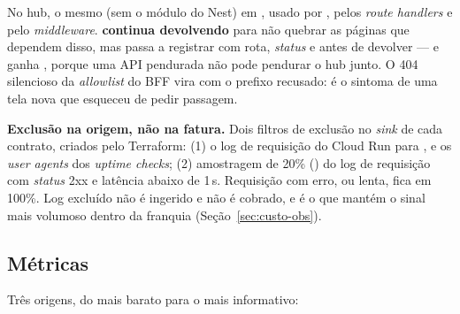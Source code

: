 No hub, o mesmo  (sem o módulo do Nest) em , usado
por , pelos \emph{route handlers} e pelo
\emph{middleware}.  \textbf{continua devolvendo }
para não quebrar as páginas que dependem disso, mas passa a registrar
 com rota, \emph{status} e  antes de devolver ---
e ganha , porque uma API pendurada não pode
pendurar o hub junto. O 404 silencioso da \emph{allowlist} do BFF vira
 com o prefixo recusado: é o sintoma de uma tela nova que
esqueceu de pedir passagem.

\begin{regra}
\textbf{Exclusão na origem, não na fatura.} Dois filtros de exclusão no
\emph{sink}  de cada contrato, criados pelo Terraform:
(1) o log de requisição do Cloud Run para ,  e
os \emph{user agents} dos \emph{uptime checks}; (2) amostragem de 20\%
() do log de requisição com \emph{status} 2xx e
latência abaixo de 1\,s. Requisição com erro, ou lenta, fica em 100\%. Log
excluído não é ingerido e não é cobrado, e é o que mantém o sinal mais
volumoso dentro da franquia (Seção~\ref{sec:custo-obs}).
\end{regra}

\subsection{Métricas}
\label{sec:metricas-obs}

Três origens, do mais barato para o mais informativo:

